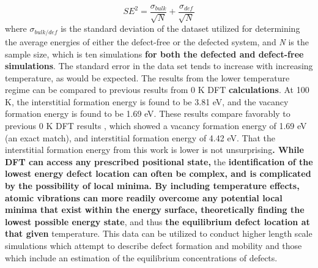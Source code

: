 \documentclass[utf8]{frontiersSCNS} %
\providecommand{\DIFaddtex}[1]{{\bf #1}} %
\providecommand{\DIFdeltex}[1]{} %
\providecommand{\DIFaddbegin}{\protect\color{blue}} %
\providecommand{\DIFaddend}{\protect\color{black}} %
\providecommand{\DIFdelbegin}{\protect\color{red}} %
\providecommand{\DIFdelend}{\protect\color{black}} %
\providecommand{\DIFadd}[1]{\texorpdfstring{\DIFaddtex{#1}}{#1}} %
\providecommand{\DIFdel}[1]{\texorpdfstring{\DIFdeltex{#1}}{}} %
\begin{document}
\begin{equation}
\label{eq:surf}
SE^2 = \frac{\sigma_{bulk}}{\sqrt{N}} + \frac{\sigma_{def}}{\sqrt{N}}
\end{equation}where \DIFdelbegin \DIFdel{$\sigma_{bulk/defect}$ }\DIFdelend \DIFaddbegin \DIFadd{$\sigma_{bulk/def}$ }\DIFaddend is the standard deviation of the dataset utilized for determining the average energies of either the defect-free or the defected system, and \textit{N} is the sample size, which is ten simulations \DIFaddbegin \DIFadd{for both the defected and defect-free simulations}\DIFaddend . The standard error in the data set tends to increase with increasing temperature, as would be expected. The results from the lower temperature regime can be compared to previous results from 0 K DFT \DIFdelbegin \DIFdel{calculation}\DIFdelend \DIFaddbegin \DIFadd{calculations}\DIFaddend . At 100 K, the interstitial formation energy is found to be 3.81 eV, and the vacancy formation energy is found to be 1.69 eV. These results compare favorably to previous 0 K DFT results \cite{wirth2011}, which showed a vacancy formation energy of 1.69 eV (an exact match), and interstitial formation energy of 4.42 eV. That the interstitial formation energy from this work is lower is not unsurprising\DIFdelbegin \DIFdel{, as the effect of temperature can yield additional relaxation pathways or defect reorientation that is not strictly achievable through calculations at 0 K. However, }\DIFdelend \DIFaddbegin \DIFadd{. While DFT can access any prescribed positional state, }\DIFaddend the \DIFdelbegin \DIFdel{magnitude of the relaxation cannot be reasonably estimated from 0 K}\DIFdelend \DIFaddbegin \DIFadd{identification of the lowest energy defect location can often be complex, and is complicated by the possibility of local minima. By including temperature effects, atomic vibrations can more readily overcome any potential local minima that exist within the energy surface, theoretically finding the lowest possible energy state}\DIFaddend , and thus \DIFdelbegin \DIFdel{requires these high temperature calculations to determine true defect behavior at non-zero }\DIFdelend \DIFaddbegin \DIFadd{the equilibrium defect location at that given }\DIFaddend temperature. This data can be utilized to conduct higher length scale simulations which attempt to describe defect formation and mobility and those which include an estimation of the equilibrium concentrations of defects. 
\end{document}
